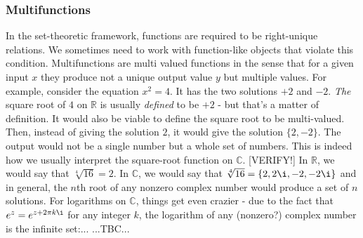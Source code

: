 







\subsubsection{Multifunctions}
In the set-theoretic framework, functions are required to be right-unique relations. We sometimes need to work with function-like objects that violate this condition. Multifunctions are multi valued functions in the sense that for a given input $x$ they produce not a unique output value $y$ but multiple values. For example, consider the equation $x^2 = 4$. It has the two solutions $+2$ and $-2$. \emph{The} square root of $4$ on $\mathbb{R}$ is usually \emph{defined} to be $+2$ - but that's a matter of definition. It would also be viable to define the square root to be multi-valued. Then, instead of giving the solution $2$, it would give the solution $\{2,-2\}$. The output would not be a single number but a whole set of numbers. This is indeed how we usually interpret the square-root function on $\mathbb{C}$. [VERIFY!] In $\mathbb{R}$, we would say that $\sqrt[4]{16} = 2$. In $\mathbb{C}$, we would say that $\sqrt[4]{16} = \{2,2\i,-2,-2\i\}$ and in general, the $n$th root of any nonzero complex number would produce a set of $n$ solutions. For logarithms on $\mathbb{C}$, things get even crazier - due to the fact that $e^z = e^{z + 2 \pi k \i}$ for any integer $k$, the logarithm of any (nonzero?) complex number is the infinite set:...
...TBC...




